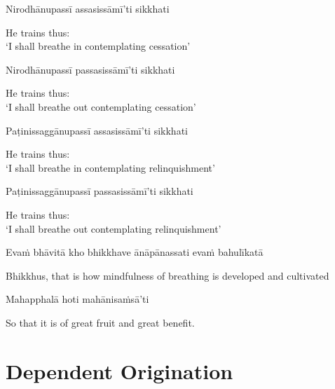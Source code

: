 Nirodhānupassī assasissāmī'ti sikkhati

\begin{english}
  He trains thus:\\
  `I shall breathe in contemplating cessation'
\end{english}

Nirodhānupassī passasissāmī'ti sikkhati

\begin{english}
  He trains thus:\\
  `I shall breathe out contemplating cessation'
\end{english}

Paṭinissaggānupassī assasissāmī'ti sikkhati

\begin{english}
  He trains thus:\\
  `I shall breathe in contemplating relinquishment'
\end{english}

Paṭinissaggānupassī passasissāmī'ti sikkhati

\begin{english}
  He trains thus:\\
  `I shall breathe out contemplating relinquishment'
\end{english}

Evaṁ bhāvitā kho bhikkhave ānāpānassati evaṁ bahulīkatā

\begin{english-hang}
  Bhikkhus, that is how mindfulness of breathing is developed and cultivated
\end{english-hang}

Mahapphalā hoti mahānisaṁsā'ti

\begin{english}
  So that it is of great fruit and great benefit.
\end{english}

\suttaRef{[MN 118]}


\section{Dependent Origination}
\label{dependent-origination}

